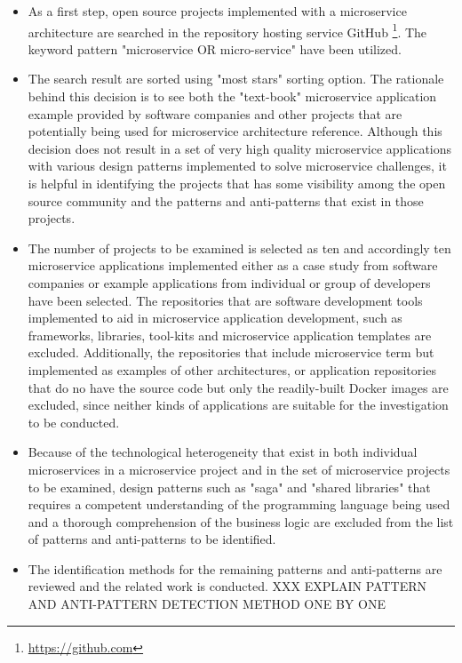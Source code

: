 \documentclass{Configuration_Files/PoliMi3i_thesis}
\begin{document}
\begin{itemize}
    \item As a first step, open source projects implemented with a microservice architecture are searched in the repository hosting service GitHub \footnote{\href{https://github.com}{https://github.com}}.
    The keyword pattern "microservice OR micro-service" have been utilized.

    \item The search result are sorted using "most stars" sorting option.
    The rationale behind this decision is to see both the "text-book" microservice application example provided by software companies and other projects that are potentially being used for microservice architecture reference.
    Although this decision does not result in a set of very high quality microservice applications with various design patterns implemented to solve microservice challenges, it is helpful in identifying the projects that has some visibility among the open source community and the patterns and anti-patterns that exist in those projects.
    
    \item The number of projects to be examined is selected as ten and accordingly ten microservice applications implemented either as a case study from software companies or example applications from individual or group of developers have been selected.
    The repositories that are software development tools implemented to aid in microservice application development, such as frameworks, libraries, tool-kits and microservice application templates are excluded.
    Additionally, the repositories that include microservice term but implemented as examples of other architectures, or application repositories that do no have the source code but only the readily-built Docker images are excluded, since neither kinds of applications are suitable for the investigation to be conducted.
    
    \item Because of the technological heterogeneity that exist in both individual microservices in a microservice project and in the set of microservice projects to be examined, design patterns such as "saga" and "shared libraries" that requires a competent understanding of the programming language being used and a thorough comprehension of the business logic are excluded from the list of patterns and anti-patterns to be identified.
    
    \item The identification methods for the remaining patterns and anti-patterns are reviewed and the related work is conducted.
    XXX EXPLAIN PATTERN AND ANTI-PATTERN DETECTION METHOD ONE BY ONE
\end{itemize}
\end{document}
